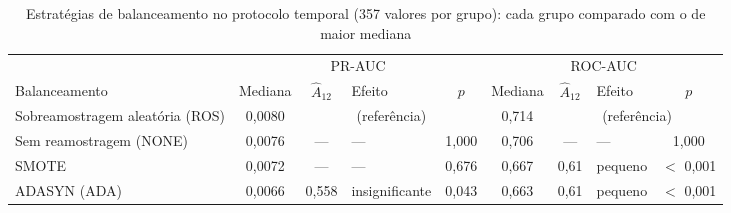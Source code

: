 \begin{table}[htbp]
    
    \centering
    \scriptsize
    \setlength{\tabcolsep}{3pt}%
    \caption{Estratégias de balanceamento no protocolo temporal (357 valores por grupo): cada grupo comparado com o de maior mediana}
    \label{tab:res-a12-fatores-reamostragem}
    \begin{tabular}{lcclc|cclc}
        \toprule
         & \multicolumn{4}{c|}{PR-AUC} & \multicolumn{4}{c}{ROC-AUC} \\
        \cmidrule(lr){2-5}\cmidrule(lr){6-9}
        Balanceamento & Mediana & $\hat{A}_{12}$ & Efeito & $p$ & Mediana & $\hat{A}_{12}$ & Efeito & $p$ \\
        \midrule
        Sobreamostragem aleatória (ROS) & 0,0080 & \multicolumn{3}{c}{(referência)} & 0,714 & \multicolumn{3}{c}{(referência)} \\
        Sem reamostragem (NONE) & 0,0076 & --- & --- & 1,000 & 0,706 & --- & --- & 1,000 \\
        SMOTE & 0,0072 & --- & --- & 0,676 & 0,667 & 0,61 & pequeno & $<$ 0,001 \\
        ADASYN (ADA) & 0,0066 & 0,558 & insignificante & 0,043 & 0,663 & 0,61 & pequeno & $<$ 0,001 \\
        \bottomrule
    \end{tabular}
\end{table}%
